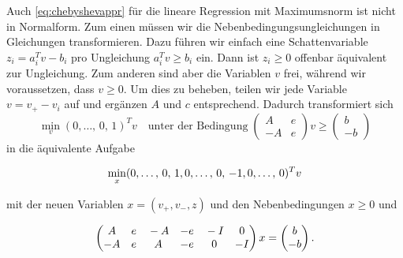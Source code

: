 Auch \eqref{eq:chebyshevappr} für die lineare Regression mit
Maximumsnorm ist nicht in Normalform. Zum einen müssen wir die
Nebenbedingungsungleichungen in Gleichungen transformieren. Dazu
führen wir einfach eine Schattenvariable $z_i=a_i^Tv - b_i$ pro
Ungleichung $a_i^Tv\ge b_i$ ein. Dann ist $z_i\ge 0$ offenbar
äquivalent zur Ungleichung. Zum anderen sind aber die Variablen $v$
frei, während wir voraussetzen, dass $v\ge 0$. Um dies zu beheben,
teilen wir jede Variable $v=v_+ - v_i$ auf und ergänzen $A$ und $c$
entsprechend. Dadurch transformiert sich
\begin{equation}
  \min_v (0,\ldots,\,0,\,1)^T v\quad\text{unter der Bedingung}\;
  \begin{pmatrix}
    A & e\\
    -A & e
  \end{pmatrix} v \ge
  \begin{pmatrix}
    b\\
    -b
  \end{pmatrix}
\end{equation}
in die äquivalente Aufgabe
{\samepage\begin{equation}
    \label{eq:chebyshevapprnf}
    \min_x (\tikzlabel{vpl}0,\ldots,\,0,\,1\tikzlabel{vpr},
    \tikzlabel{vml}0,\ldots,\,0,\,-1\tikzlabel{vmr},
    \tikzlabel{zl}0,\ldots,\,0\tikzlabel{zr})^T v
  \end{equation}
  }
mit der neuen Variablen $x=(v_+,v_-,z)$ und den Nebenbedingungen $x\ge 0$
und
{\samepage\vspace{0.2em}%
\begin{equation*}
  \begin{pmatrix}
    \tikzlabel{vpl}A  & e\tikzlabel{vpr} & 
    \tikzlabel{vml}-A & -e\tikzlabel{vmr} &
    \tikzlabel{zl} -I & 0\tikzlabel{zr}\\
    -A & e &  A & -e & 0 & -I
  \end{pmatrix}
  x =
  \begin{pmatrix}
    b\\
    -b
  \end{pmatrix}.
\end{equation*}
}

